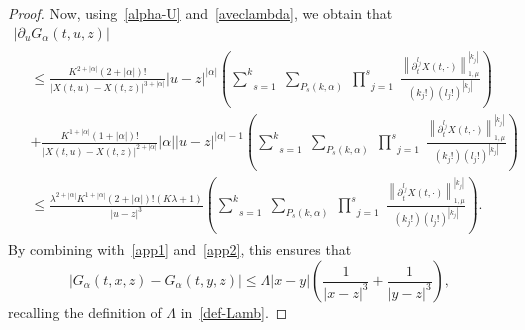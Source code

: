 \documentclass[AHL,Unicode,longabstracts,published]{cedram}
\renewcommand{\leq}{\leqslant}
\begin{document}
\begin{proof}
Now, using~\eqref{alpha-U} and~\eqref{aveclambda}, we obtain that
\begin{multline*}
|\partial_{u} G_\alpha(t,u,z)|\\
\begin{aligned}
&\leq \frac{K^{2+|\alpha|}(2+|\alpha|)!}{|X(t,u)-X(t,z)|^{3+|\alpha|}}|u-z|^{|\alpha|}\left(\underset{s=1}{\overset{k}{\sum}}\;\underset{P_s(k,\alpha)}{\sum}\;\underset{j=1}{\overset{s}{\prod}}\;\frac{\left\|\partial_t^{l_j}X(t,\cdot) \right\|_{1,\mu}^{|k_j|}}{\left(k_j!\right) \left(l_j!\right)^{\left|k_j\right|}}\right)\\
&+ \frac{K^{1+|\alpha|}(1+|\alpha|)!}{| X(t,u)-X(t,z)|^{2+|\alpha|} }|\alpha||u-z|^{|\alpha|-1}\left(\underset{s=1}{\overset{k}{\sum}}\;\underset{P_s(k,\alpha)}{\sum}\;\underset{j=1}{\overset{s}{\prod}}\;\frac{\left\|\partial_t^{l_j}X(t,\cdot)\right\|_{1,\mu}^{\left|k_j\right|}}{\left(k_j!\right) \left(l_j!\right)^{|k_j|}}\right)\\
&\leq \frac{\lambda^{2+|\alpha|} K^{1+|\alpha|}(2+|\alpha|)! \left(K\lambda+1 \right) }{|u-z|^3}\left(\underset{s=1}{\overset{k}{\sum}}\;\underset{P_s(k,\alpha)}{\sum}\;\underset{j=1}{\overset{s}{\prod}}\;\frac{\left\|\partial_t^{l_j}X(t,\cdot) \right\|_{1,\mu}^{\left|k_j\right|}}{\left(k_j!\right) \left(l_j!\right)^{\left|k_j\right|}}\right).
\end{aligned}
\end{multline*}
By combining with~\eqref{app1} and~\eqref{app2}, this ensures that
\begin{equation}\label{lipschitz_type}
|G_\alpha(t,x,z)-G_\alpha(t,y,z)|\leq \Lambda |x-y| \left(\frac{1}{|x-z|^3}+\frac{1}{|y-z|^3} \right),
\end{equation}
recalling the definition of $
\Lambda $ in~\eqref{def-Lamb}.



\end{proof}
\end{document}
